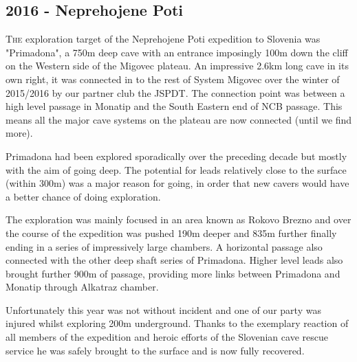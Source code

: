 \begin{tcolorbox}
\chapter{2016 - Neprehojene Poti}
	\lettrine{T}{he} exploration target of the Neprehojene Poti expedition to Slovenia was "Primadona", a 750m deep cave with an entrance imposingly 100m down the cliff on the Western side of the Migovec plateau. An impressive 2.6km long cave in its own right, it was connected in to the rest of System Migovec over the winter of 2015/2016 by our partner club the JSPDT. The connection point was between a high level passage in Monatip and the South Eastern end of NCB passage. This means all the major cave systems on the plateau are now connected (until we find more).

	Primadona had been explored sporadically over the preceding decade but mostly with the aim of going deep. The potential for leads relatively close to the surface (within 300m) was a major reason for going, in order that new cavers would have a better chance of doing exploration.

	The exploration was mainly focused in an area known as Rokovo Brezno and over the course of the expedition was pushed 190m deeper and 835m further finally ending in a series of impressively large chambers.  A horizontal passage also connected with the other deep shaft series of Primadona. Higher level leads also brought further 900m of passage, providing more links between Primadona and Monatip through Alkatraz chamber.

	Unfortunately this year was not without incident and one of our party was injured whilst exploring 200m underground. Thanks to the exemplary reaction of all members of the expedition and heroic efforts of the Slovenian cave rescue service he was safely brought to the surface and is now fully recovered.
\end{tcolorbox}